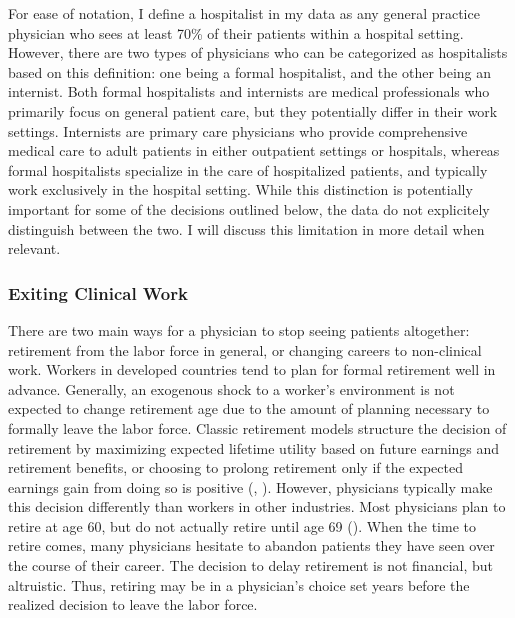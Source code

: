 \documentclass[12pt]{article}
\begin{document}
For ease of notation, I define a hospitalist in my data as any general practice physician who sees at least 70\% of their patients within a hospital setting. However, there are two types of physicians who can be categorized as hospitalists based on this definition: one being a formal hospitalist, and the other being an internist. Both formal hospitalists and internists are medical professionals who primarily focus on general patient care, but they potentially differ in their work settings. Internists are primary care physicians who provide comprehensive medical care to adult patients in either outpatient settings or hospitals, whereas formal hospitalists specialize in the care of hospitalized patients, and typically work exclusively in the hospital setting. While this distinction is potentially important for some of the decisions outlined below, the data do not explicitely distinguish between the two. I will discuss this limitation in more detail when relevant. 

\subsubsection{Exiting Clinical Work}

There are two main ways for a physician to stop seeing patients altogether: retirement from the labor force in general, or changing careers to non-clinical work. Workers in developed countries tend to plan for formal retirement well in advance. Generally, an exogenous shock to a worker's environment is not expected to change retirement age due to the amount of planning necessary to formally leave the labor force. Classic retirement models structure the decision of retirement by maximizing expected lifetime utility based on future earnings and retirement benefits, or choosing to prolong retirement only if the expected earnings gain from doing so is positive (\cite{gustman1986disaggregated}, \cite{stock1990pension}). However, physicians typically make this decision differently than workers in other industries. Most physicians plan to retire at age 60, but do not actually retire until age 69 (\cite{collier2017challenges}). When the time to retire comes, many physicians hesitate to abandon patients they have seen over the course of their career. The decision to delay retirement is not financial, but altruistic. Thus, retiring may be in a physician's choice set years before the realized decision to leave the labor force. 
\end{document}
